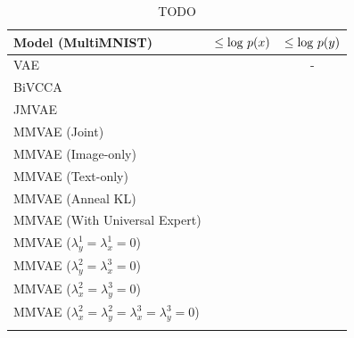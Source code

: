 \documentclass{article}
\begin{document}
\begin{table}[!h]
    \centering
    \begin{tabular}{ l | c | c }
        Model (MultiMNIST) & $\leq \textup{log }p(x)$ & $\leq \textup{log }p(y)$ \\
        \hline
        VAE & & - \\
        BiVCCA & &  \\
        JMVAE & & \\
        MMVAE (Joint) & & \\
        MMVAE (Image-only) & & \\
        MMVAE (Text-only) & & \\
        MMVAE (Anneal KL) & & \\
        MMVAE (With Universal Expert) & & \\
        MMVAE ($\lambda_{y}^{1} = \lambda_{x}^{1} = 0$) & & \\
        MMVAE ($\lambda_{y}^{2} = \lambda_{x}^{3} = 0$) & & \\
        MMVAE ($\lambda_{x}^{2} = \lambda_{y}^{3} = 0$) & & \\
        MMVAE ($\lambda_{x}^{2} = \lambda_{y}^{2} = \lambda_{x}^{3} = \lambda_{y}^{3} = 0$) & & \\
        \newline
    \end{tabular}
    \caption{TODO}
    \label{table:multimnist:marginal}
\end{table}
\end{document}
